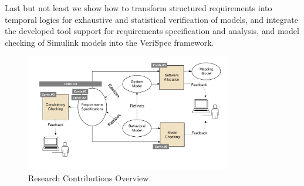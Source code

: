 Last but not least we show how to transform structured requirements into temporal logics for exhaustive and statistical verification of models, and integrate the developed tool support for requirements specification and analysis, and model checking of Simulink models into the VeriSpec framework. 

\begin{figure}[h]
  \centering
  \includegraphics[trim=10 10 10 15,clip,width=0.8\textwidth]{pics/contributions.pdf}
  \caption{Research Contributions Overview.}
  \label{fig_contributions}
\end{figure}

